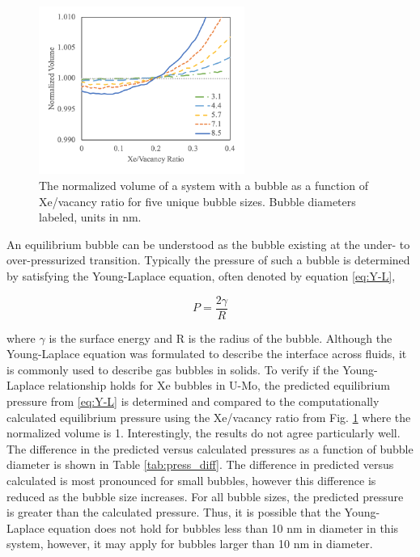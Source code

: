 \documentclass[review]{elsarticle}
\begin{document}
\begin{figure}[h]
 \centering
 \includegraphics[width=0.6\textwidth]{5_delV.png} 
 \caption{The normalized volume of a system with a bubble as a function of Xe/vacancy ratio for five unique bubble sizes. Bubble diameters labeled, units in nm.}
 \label{fig:delV}
\end{figure}

An equilibrium bubble can be understood as the bubble existing at the under- to over-pressurized transition. Typically the pressure of such a bubble is determined by satisfying the Young-Laplace equation, often denoted by equation \ref{eq:Y-L},

\begin{equation}
\label{eq:Y-L}
P = \frac{2\gamma}{R}
\end{equation}

where $\gamma$ is the surface energy and R is the radius of the bubble. Although the Young-Laplace equation was formulated to describe the interface across fluids, it is commonly used to describe gas bubbles in solids. To verify if the Young-Laplace relationship holds for Xe bubbles in U-Mo, the predicted equilibrium pressure from \ref{eq:Y-L} is determined and compared to the computationally calculated equilibrium pressure using the Xe/vacancy ratio from Fig. \ref{fig:delV} where the normalized volume is 1. Interestingly, the results do not agree particularly well. The difference in the predicted versus calculated pressures as a function of bubble diameter is shown in Table \ref{tab:press_diff}. The difference in predicted versus calculated is most pronounced for small bubbles, however this difference is reduced as the bubble size increases. For all bubble sizes, the predicted pressure is greater than the calculated pressure. Thus, it is possible that the Young-Laplace equation does not hold for bubbles less than 10 nm in diameter in this system, however, it may apply for bubbles larger than 10 nm in diameter. 
\end{document}
